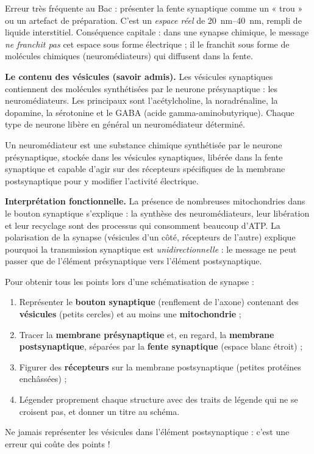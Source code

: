 \documentclass[11pt]{article}
\newcommand{\cle}[1]{{\popxbold\color{popdark}#1}}
\begin{document}
\begin{attention}
Erreur très fréquente au Bac : présenter la fente synaptique comme un « trou » ou un artefact de préparation. C'est un \emph{espace réel} de \SIrange{20}{40}{\nano\metre}, rempli de liquide interstitiel. Conséquence capitale : dans une synapse chimique, le message \emph{ne franchit pas} cet espace sous forme électrique ; il le franchit sous forme de molécules chimiques (neuromédiateurs) qui diffusent dans la fente.
\end{attention}

\textbf{Le contenu des vésicules (savoir admis).} Les vésicules synaptiques contiennent des molécules synthétisées par le neurone présynaptique : les \cle{neuromédiateurs}. Les principaux sont l'\cle{acétylcholine}, la \cle{noradrénaline}, la \cle{dopamine}, la \cle{sérotonine} et le \cle{GABA} (acide gamma-aminobutyrique). Chaque type de neurone libère en général un neuromédiateur déterminé.

\begin{definition}[Neuromédiateur]
Un \cle{neuromédiateur} est une substance chimique synthétisée par le neurone présynaptique, stockée dans les vésicules synaptiques, libérée dans la fente synaptique et capable d'agir sur des récepteurs spécifiques de la membrane postsynaptique pour y modifier l'activité électrique.
\end{definition}

\textbf{Interprétation fonctionnelle.} La présence de nombreuses mitochondries dans le bouton synaptique s'explique : la synthèse des neuromédiateurs, leur libération et leur recyclage sont des processus qui consomment beaucoup d'ATP. La polarisation de la synapse (vésicules d'un côté, récepteurs de l'autre) explique pourquoi la transmission synaptique est \emph{unidirectionnelle} : le message ne peut passer que de l'élément présynaptique vers l'élément postsynaptique.

\begin{methode}
Pour obtenir tous les points lors d'une schématisation de synapse :
\begin{enumerate}
\item Représenter le \textbf{bouton synaptique} (renflement de l'axone) contenant des \textbf{vésicules} (petits cercles) et au moins une \textbf{mitochondrie} ;
\item Tracer la \textbf{membrane présynaptique} et, en regard, la \textbf{membrane postsynaptique}, séparées par la \textbf{fente synaptique} (espace blanc étroit) ;
\item Figurer des \textbf{récepteurs} sur la membrane postsynaptique (petites protéines enchâssées) ;
\item Légender proprement chaque structure avec des traits de légende qui ne se croisent pas, et donner un titre au schéma.
\end{enumerate}
Ne jamais représenter les vésicules dans l'élément postsynaptique : c'est une erreur qui coûte des points !
\end{methode}
\end{document}
